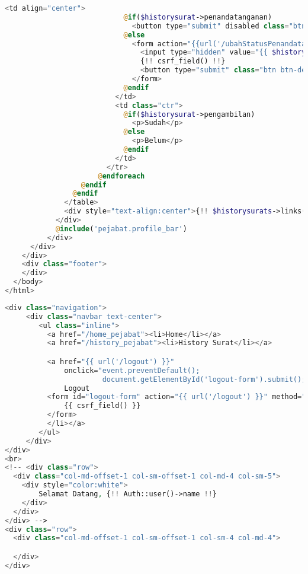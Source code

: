 \begin{lstlisting}[language=php,basicstyle=\tiny,caption=\textit{History} pejabat]
                          <td align="center">
                            @if($historysurat->penandatanganan)
                              <button type="submit" disabled class="btn btn-success" style="display:block">Sudah</button>
                            @else
                              <form action="{{url('/ubahStatusPenandatanganan')}}" method="post">
                                <input type="hidden" value="{{ $historysurat->id }}" name="id">
                                {!! csrf_field() !!}
                                <button type="submit" class="btn btn-default " style="display:block">Belum</button>
                              </form>
                            @endif
                          </td>
                          <td class="ctr">
                            @if($historysurat->pengambilan)
                              <p>Sudah</p>
                            @else
                              <p>Belum</p>
                            @endif
                          </td>
                        </tr>
                      @endforeach
                  @endif
                @endif
              </table>
              <div style="text-align:center">{!! $historysurats->links() !!}</div>
            </div>
            @include('pejabat.profile_bar')
          </div>
      </div>
    </div>
    <div class="footer">
    </div>
  </body>
</html>

\end{lstlisting}

\begin{lstlisting}[language=php,basicstyle=\tiny,caption=\textit{Navigation bar} untuk pejabat]
	<div class="navigation">
     <div class="navbar text-center">
        <ul class="inline">
          <a href="/home_pejabat"><li>Home</li></a>
          <a href="/history_pejabat"><li>History Surat</li></a>

          <a href="{{ url('/logout') }}"
              onclick="event.preventDefault();
                       document.getElementById('logout-form').submit();"><li>
              Logout
          <form id="logout-form" action="{{ url('/logout') }}" method="POST" style="display: none;">
              {{ csrf_field() }}
          </form>
          </li></a>
        </ul>
     </div>
</div>
<br>
<!-- <div class="row">
  <div class="col-md-offset-1 col-sm-offset-1 col-md-4 col-sm-5">
    <div style="color:white">
        Selamat Datang, {!! Auth::user()->name !!}
    </div>
  </div>
</div> -->
<div class="row">
  <div class="col-md-offset-1 col-sm-offset-1 col-sm-4 col-md-4">

  </div>
</div>

\end{lstlisting}

